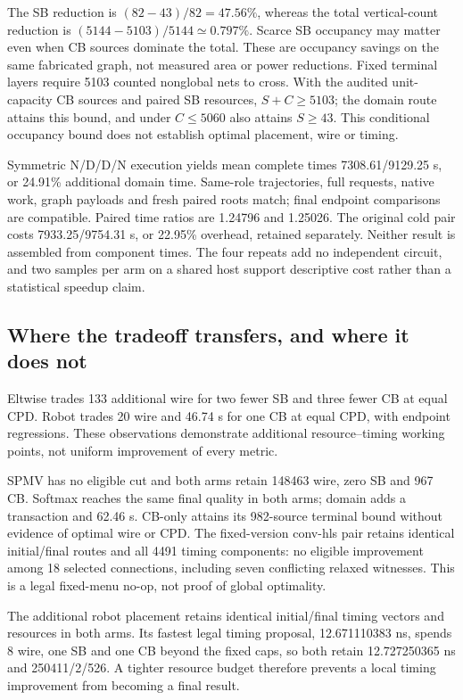 \documentclass[conference,10pt]{IEEEtran}
\begin{document}
The SB reduction is $(82-43)/82=47.56\%$, whereas the total vertical-count reduction is $(5144-5103)/5144\simeq0.797\%$. Scarce SB occupancy may matter even when CB sources dominate the total. These are occupancy savings on the same fabricated graph, not measured area or power reductions. Fixed terminal layers require 5103 counted nonglobal nets to cross. With the audited unit-capacity CB sources and paired SB resources, $S+C\ge5103$; the domain route attains this bound, and under $C\le5060$ also attains $S\ge43$. This conditional occupancy bound does not establish optimal placement, wire or timing.

Symmetric N/D/D/N execution yields mean complete times 7308.61/9129.25 s, or 24.91\% additional domain time. Same-role trajectories, full requests, native work, graph payloads and fresh paired roots match; final endpoint comparisons are compatible. Paired time ratios are 1.24796 and 1.25026. The original cold pair costs 7933.25/9754.31 s, or 22.95\% overhead, retained separately. Neither result is assembled from component times. The four repeats add no independent circuit, and two samples per arm on a shared host support descriptive cost rather than a statistical speedup claim.

\subsection{Where the tradeoff transfers, and where it does not}
Eltwise trades 133 additional wire for two fewer SB and three fewer CB at equal CPD. Robot trades 20 wire and 46.74 s for one CB at equal CPD, with endpoint regressions. These observations demonstrate additional resource--timing working points, not uniform improvement of every metric.

SPMV has no eligible cut and both arms retain 148463 wire, zero SB and 967 CB. Softmax reaches the same final quality in both arms; domain adds a transaction and 62.46 s. CB-only attains its 982-source terminal bound without evidence of optimal wire or CPD. The fixed-version conv-hls pair retains identical initial/final routes and all 4491 timing components: no eligible improvement among 18 selected connections, including seven conflicting relaxed witnesses. This is a legal fixed-menu no-op, not proof of global optimality.

The additional robot placement retains identical initial/final timing vectors and resources in both arms. Its fastest legal timing proposal, 12.671110383 ns, spends 8 wire, one SB and one CB beyond the fixed caps, so both retain 12.727250365 ns and 250411/2/526. A tighter resource budget therefore prevents a local timing improvement from becoming a final result.
\end{document}
